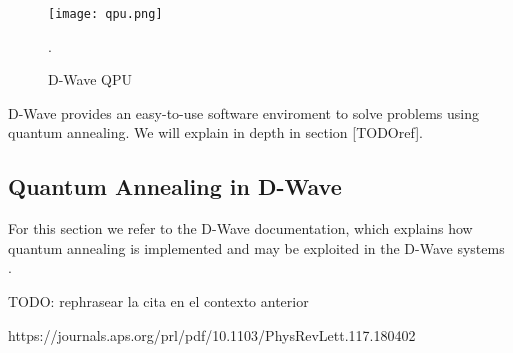 \begin{figure}[h]
	\texttt{[image: qpu.png]}
	\centering
	\caption{D-Wave QPU}.
	\label{fig 2.3}
\end{figure}

D-Wave provides an easy-to-use software enviroment to solve problems using quantum annealing. We will explain in depth in section [TODOref].


\subsection{Quantum Annealing in D-Wave}
\label{quantum-annealing-dwave}


For this section we refer to the D-Wave documentation, which explains how quantum annealing is implemented and may be exploited in the D-Wave systems \cite{DWaveDoc-QuantumAnnealing}.




TODO: rephrasear la cita en el contexto anterior











https://journals.aps.org/prl/pdf/10.1103/PhysRevLett.117.180402




